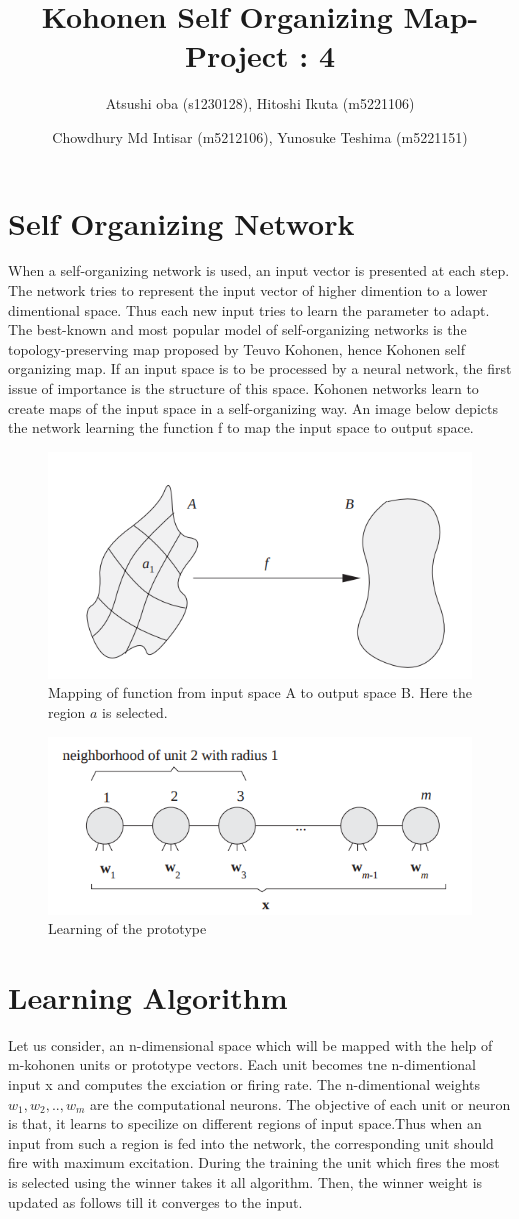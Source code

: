 \documentclass{article}
\title{ Kohonen Self Organizing Map- Project : 4 }
\author{Atsushi oba (s1230128),        Hitoshi Ikuta (m5221106) \\
   \and Chowdhury Md Intisar (m5212106),        Yunosuke Teshima (m5221151)
}
\begin{document}
\maketitle 
\section{Self Organizing Network}
  When a self-organizing network is used, an input vector is presented at
each step. The network tries to represent the input vector of higher dimention
to a lower dimentional space. Thus each new input tries to learn the parameter
to adapt. The best-known and most popular model of self-organizing networks is
the topology-preserving map proposed by Teuvo Kohonen, hence Kohonen self
organizing map. If an input space is to be processed by a neural network, the 
first issue of importance is the structure of this space.  Kohonen networks
learn to create maps of the input space in a self-organizing way. An image
below depicts the network learning the function f to map the input space to
output space. 

\begin{figure}
\centering
\includegraphics[width=.4\linewidth]{./simpleFunction.png}
\caption{Mapping of function from input space A to output space B. Here the
region \(a\) is selected.}
\end{figure}

\begin{figure}
\centering
\includegraphics[width=.4\linewidth]{./learningAlgorithm.png}
\caption{Learning of the prototype}
\end{figure}






\section{Learning Algorithm}
 Let us consider, an n-dimensional space which will be mapped with the help of
 m-kohonen units or prototype vectors. Each unit becomes tne n-dimentional input
 x and computes the exciation or firing rate. The n-dimentional weights \(w_{1},
 w_{2},.., w_{m} \) are the computational neurons. The objective of each unit or
 neuron is that, it learns to specilize on different regions of input space.Thus
 when an input from such a region is fed into the network, the corresponding
 unit should fire with maximum excitation. During the training the unit which
 fires the most is selected using the winner takes it all algorithm. Then, the
 winner weight is updated as follows till it converges to the input. 
\end{document}
